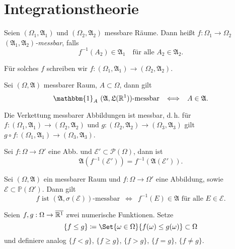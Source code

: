 \documentclass{cheat-sheet}
\newcommand{\Alg}{\mathfrak{A}} %
\newcommand{\LebAlg}{\mathfrak{L}} %
\renewcommand{\P}{\mathbb{P}} %
\newcommand{\ind}{\mathbbm{1}} %
\renewcommand{\ER}{\overline{\R^1}} %
\begin{document}

\section{Integrationstheorie}


\begin{defn}
  Seien $(\Omega_1, \Alg_1)$ und $(\Omega_2, \Alg_2)$ messbare Räume. Dann heißt $f : \Omega_1 \to \Omega_2$ \emph{$(\Alg_1, \Alg_2)$-messbar}, falls
  \[ f^{-1}(A_2) \in \Alg_1 \quad \text{für alle } A_2 \in \Alg_2. \]
\end{defn}

\begin{nota}
  Für solches $f$ schreiben wir $f : (\Omega_1, \Alg_1) \to (\Omega_2, \Alg_2)$.
\end{nota}

\begin{beobachtung}
  Sei $(\Omega, \Alg)$ messbarer Raum, $A \subset \Omega$, dann gilt
  \[ \ind_A \text{ $(\Alg, \LebAlg(\R^1))$-messbar} \enspace \iff \enspace A \in \Alg. \]
\end{beobachtung}



\begin{lem}
  Die Verkettung messbarer Abbildungen ist messbar, d.\,h. für $f : (\Omega_1, \Alg_1) \to (\Omega_2, \Alg_2)$ und $g : (\Omega_2, \Alg_2) \to (\Omega_3, \Alg_3)$ gilt $g \circ f : (\Omega_1, \Alg_1) \to (\Omega_3, \Alg_3)$.
\end{lem}

\begin{lem}
  Sei $f : \Omega \to \Omega'$ eine Abb. und $\mathcal{E}' \subset \mathcal{P}(\Omega)$, dann ist
  \[ \Alg(f^{-1}(\mathcal{E}')) = f^{-1}(\Alg(\mathcal{E}')). \]
\end{lem}

\begin{lem}
  Sei $(\Omega, \Alg)$ ein messbarer Raum und $f : \Omega \to \Omega'$ eine Abbildung, sowie $\mathcal{E} \subset \P(\Omega')$. Dann gilt
  \[ f \text{ ist $(\Alg, \sigma(\mathcal{E}))$-messbar} \enspace \iff \enspace f^{-1}(E) \in \Alg \text{ für alle } E \in \mathcal{E}. \]
\end{lem}

\begin{nota}
  Seien $f, g : \Omega \to \ER$ zwei numerische Funktionen. Setze
    \[ \{ f \leq g \} \coloneqq \Set{ \omega \in \Omega }{ f(\omega) \leq g(\omega) } \subset \Omega \]
  und definiere analog $\{ f < g \}$, $\{ f \geq g \}$, $\{ f > g \}$, $\{ f = g \}$, $\{ f \not= g \}$.
\end{nota}
\end{document}
